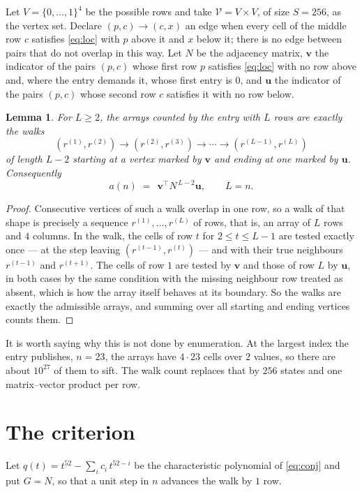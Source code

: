 \documentclass[11pt,a4paper]{article}
\theoremstyle{plain}
\newtheorem{lemma}[theorem]{Lemma}
\theoremstyle{definition}
\begin{document}
Let $V=\{0,\dots,1\}^{4}$ be the possible rows and take
$\mathcal V=V\times V$, of size $S=256$, as the vertex set. Declare $(p,c)\to(c,x)$ an edge
when every cell of the middle row $c$ satisfies \eqref{eq:loc} with $p$ above it and $x$
below it; there is no edge between pairs that do not overlap in this way. Let $N$ be the
adjacency matrix, $\mathbf{v}$ the indicator of the pairs $(p,c)$ whose first row $p$
satisfies \eqref{eq:loc} with no row above and, where the entry demands it, whose first entry is $0$, and $\mathbf{u}$ the indicator of
the pairs $(p,c)$ whose second row $c$ satisfies it with no row below.

\begin{lemma}\label{lem:walk}
For $L\ge2$, the arrays counted by the entry with $L$ rows are exactly the walks
\[
(r^{(1)},r^{(2)})\to(r^{(2)},r^{(3)})\to\cdots\to(r^{(L-1)},r^{(L)})
\]
of length $L-2$ starting at a vertex marked by $\mathbf{v}$ and ending at one marked by
$\mathbf{u}$. Consequently
\[
a(n)\;=\;\,\mathbf{v}^{\!\top}N^{\,L-2}\mathbf{u},\qquad L=n .
\]
\end{lemma}

\begin{proof}
Consecutive vertices of such a walk overlap in one row, so a walk of that shape is
precisely a sequence $r^{(1)},\dots,r^{(L)}$ of rows, that is, an array of $L$ rows
and $4$ columns. In the walk, the cells of row $t$ for $2\le t\le L-1$ are tested
exactly once --- at the step leaving $(r^{(t-1)},r^{(t)})$ --- and with their true
neighbours $r^{(t-1)}$ and $r^{(t+1)}$. The cells of row $1$ are tested by
$\mathbf{v}$ and those of row $L$ by $\mathbf{u}$, in both cases by the same condition
with the missing neighbour row treated as absent, which is how the array itself behaves at
its boundary. So the walks are exactly the admissible arrays, and summing over all starting
and ending vertices counts them.
\end{proof}


It is worth saying why this is not done by enumeration. At the largest index the entry
publishes, $n=23$, the arrays have $4\cdot23$ cells over
$2$ values, so there are about $10^{27}$ of them to sift. The
walk count replaces that by $256$ states and one matrix--vector product per row.
\section{The criterion}

Let $q(t)=t^{52}-\sum_i c_i\,t^{52-i}$ be the characteristic polynomial of
\eqref{eq:conj} and put $G=N$, so that a unit step in $n$ advances the walk by
$1$ row.
\end{document}
